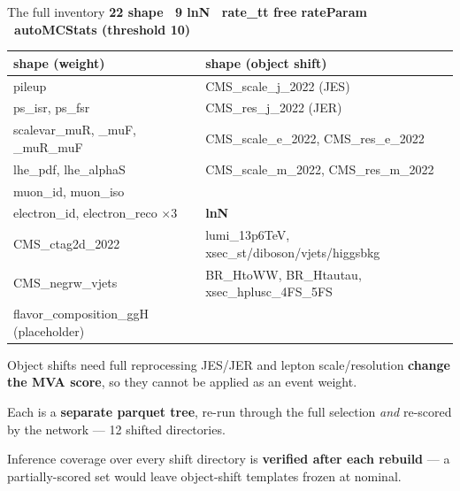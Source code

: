 \documentclass[aspectratio=169,10pt]{beamer}
\newcommand{\code}[1]{{\ttfamily\small\colorbox{codebg}{#1}}}
\begin{document}
\begin{frame}{The full inventory}
\textbf{22 shape \textperiodcentered\ 9 lnN \textperiodcentered\ \code{rate\_tt}
free rateParam \textperiodcentered\ autoMCStats (threshold 10)}
\vspace{0.3em}
\begin{center}
\scriptsize
\begin{tabular}{ll}
\toprule
shape (weight) & shape (object shift) \\
\midrule
\code{pileup} & \code{CMS\_scale\_j\_2022} (JES) \\
\code{ps\_isr}, \code{ps\_fsr} & \code{CMS\_res\_j\_2022} (JER) \\
\code{scalevar\_muR}, \code{\_muF}, \code{\_muR\_muF} & \code{CMS\_scale\_e\_2022}, \code{CMS\_res\_e\_2022} \\
\code{lhe\_pdf}, \code{lhe\_alphaS} & \code{CMS\_scale\_m\_2022}, \code{CMS\_res\_m\_2022} \\
\code{muon\_id}, \code{muon\_iso} & \\
\code{electron\_id}, \code{electron\_reco} $\times$3 & \textbf{lnN} \\
\code{CMS\_ctag2d\_2022} & \code{lumi\_13p6TeV}, \code{xsec\_st/diboson/vjets/higgsbkg} \\
\code{CMS\_negrw\_vjets} & \code{BR\_HtoWW}, \code{BR\_Htautau}, \code{xsec\_hplusc\_4FS\_5FS} \\
\code{flavor\_composition\_ggH} (placeholder) & \\
\bottomrule
\end{tabular}
\end{center}
\end{frame}

\begin{frame}{Object shifts need full reprocessing}
JES/JER and lepton scale/resolution \textbf{change the MVA score}, so they cannot be
applied as an event weight.
\vspace{0.4em}

Each is a \textbf{separate parquet tree}, re-run through the full selection
\emph{and} re-scored by the network --- 12 shifted directories.
\vspace{0.4em}
\begin{keybox}
Inference coverage over every shift directory is \textbf{verified after each
rebuild} --- a partially-scored set would leave object-shift templates frozen at
nominal.
\end{keybox}
\end{frame}
\end{document}
